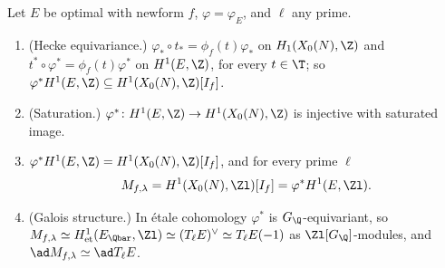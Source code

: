 \begin{proposition}\label{prop:moddeg:mf-is-pullback}
Let $E$ be optimal with newform $f$, $\varphi=\varphi_E$, and $\ell$ any prime.
\begin{enumerate}[label=(\alph*)]
\item (Hecke equivariance.) $\varphi_*\circ t_*=\phi_f(t)\varphi_*$ on $H_1(X_0(N),\Z)$ and $t^*\circ\varphi^*=\phi_f(t)\varphi^*$ on $H^1(E,\Z)$, for every $t\in\T$; so $\varphi^*H^1(E,\Z)\subseteq H^1(X_0(N),\Z)[I_f]$.
\item (Saturation.) $\varphi^*\colon H^1(E,\Z)\to H^1(X_0(N),\Z)$ is injective with saturated image.
\item $\varphi^*H^1(E,\Z)=H^1(X_0(N),\Z)[I_f]$, and for every prime $\ell$
\[
M_{f,\lambda}=H^1(X_0(N),\Zl)[I_f]=\varphi^*H^1(E,\Zl).
\]
\item (Galois structure.) In \'etale cohomology $\varphi^*$ is $G_\Q$-equivariant, so $M_{f,\lambda}\simeq H^1_{\mathrm{et}}(E_{\Qbar},\Zl)\simeq(T_\ell E)^\vee\simeq T_\ell E(-1)$ as $\Zl[G_\Q]$-modules, and
$\ad M_{f,\lambda}\simeq\ad T_\ell E$.
\end{enumerate}
\end{proposition}

